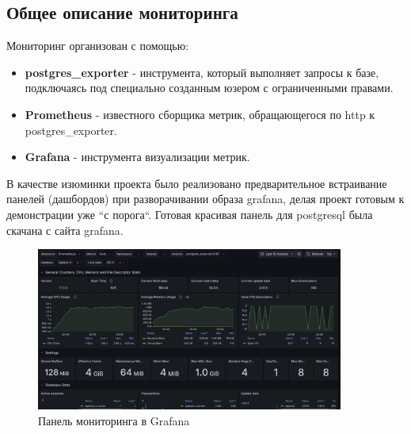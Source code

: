\subsection{Общее описание мониторинга}\label{subsec:-monitoringall-}
Мониторинг организован с помощью:

\begin{itemize}
    \item \textbf{postgres\_exporter} - инструмента, который выполняет запросы к базе, подключаясь под
    специально созданным юзером с ограниченными правами.
    \item \textbf{Prometheus} - известного сборщика метрик, обращающегося по http к postgres\_exporter.
    \item \textbf{Grafana} - инструмента визуализации метрик.
\end{itemize}

В качестве изюминки проекта было реализовано предварительное встраивание панелей (дашбордов)
при разворачивании образа grafana, делая проект готовым к демонстрации уже ``с порога``.
Готовая красивая панель для postgresql была скачана с сайта grafana.

\begin{figure}[htbp]
    \centering
    \includegraphics[width=0.9\textwidth]{grafana} %
    \caption{Панель мониторинга в Grafana}\label{fig:grafanapic}
\end{figure}